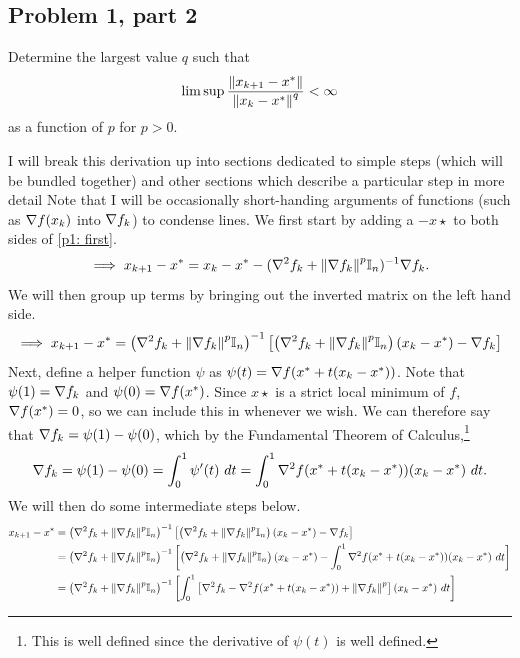 \subsection{Problem 1, part 2}
Determine the largest value $q$ such that 
\[\limsup \frac{\norm{x_{k+1} - x^{*}}}{\norm{x_k - x^{*}}^q} < \infty\] 
as a function of $p$ for $p > 0$.
\partbreak
\begin{solution}

    I will break this derivation up into sections dedicated to simple steps (which will be bundled together) and other sections which describe a particular step in more detail Note that I will be occasionally short-handing arguments of functions (such as $\nabla f(x_k)$ into $\nabla f_k$) to condense lines. We first start by adding a $-x\star$ to both sides of \ref{p1: first}. 
    \[\implies x_{k+1} - x^{*} = x_k - x^{*} - (\nabla^2f_k + \norm{\nabla f_k}^p\mathbb{I}_n)^{-1} \nabla f_k.\]
    We will then group up terms by bringing out the inverted matrix on the left hand side.
    \[\implies x_{k+1} - x^{*} = \left ( \nabla^2f_k + \norm{\nabla f_k}^p \mathbb{I}_n\right)^{-1}\left[ \left(\nabla^2f_k + \norm{\nabla f_k}^p \mathbb{I}_n\right)(x_k - x^{*}) - \nabla f_k\right]\]
    Next, define a helper function $\psi$ as $\psi(t) = \nabla f(x^{*} + t(x_k - x^{*}))$. Note that $\psi(1) = \nabla f_k$ and $\psi(0) = \nabla f(x^{*})$. Since $x\star$ is a strict local minimum of $f$, $\nabla f(x^{*}) = 0$, so we can include this in whenever we wish. We can therefore say that $\nabla f_k = \psi(1) - \psi(0)$, which by the Fundamental Theorem of Calculus,\footnote{This is well defined since the derivative of $\psi(t)$ is well defined. } 
    \[\grad f_k = \psi(1) - \psi(0) =\int_0^1 \psi '(t) \ dt = \int_0^1 \grad^2 f(x\star + t(x_k - x\star)) (x_k - x\star) \ dt.\]
    We will then do some intermediate steps below.
{\footnotesize
    \begin{align*}
        x_{k+1} - x^{*} &= \left ( \nabla^2f_k + \norm{\nabla f_k}^p \mathbb{I}_n\right)^{-1}\left[ \left(\nabla^2f_k + \norm{\nabla f_k}^p \mathbb{I}_n\right)(x_k - x^{*}) - \nabla f_k\right] \\
         &= \left ( \nabla^2f_k + \norm{\nabla f_k}^p \mathbb{I}_n\right)^{-1}\left[ \left(\nabla^2f_k + \norm{\nabla f_k}^p \mathbb{I}_n\right)(x_k - x^{*}) - \int_0^1 \nabla^2 f(x^{*} + t(x_k - x^{*})) (x_k - x^{*}) \ dt\right]\\ 
         &= \left ( \nabla^2f_k + \norm{\nabla f_k}^p \mathbb{I}_n\right)^{-1}\left[ \int_0^1 \left[ \nabla^2 f_k - \nabla^2f(x^{*} + t(x_k - x^{*})) + \norm{\nabla f_k}^p\right](x_k - x^{*}) \ dt\right]\\ 
    \end{align*}}
    \vspace{-20mm}
    

\end{solution}
